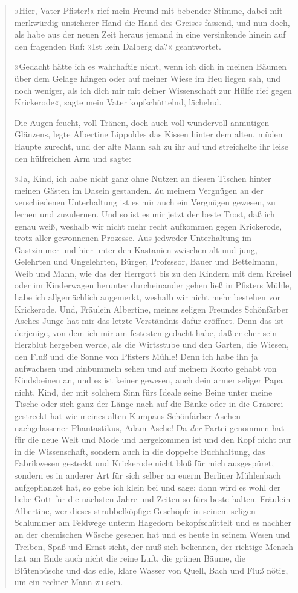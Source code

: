 \begin{verse}
»Hier, Vater Pfister!« rief mein Freund mit bebender Stimme, dabei
mit merkwürdig unsicherer Hand die Hand des Greises fassend, und
nun doch, als habe aus der neuen Zeit heraus jemand in eine
versinkende hinein auf den fragenden Ruf: »Ist kein Dalberg da?«
geantwortet.

»Gedacht hätte ich es wahrhaftig nicht, wenn ich dich in meinen
Bäumen über dem Gelage hängen oder auf meiner Wiese im Heu liegen
sah, und noch weniger, als ich dich mir mit deiner Wissenschaft zur
Hülfe rief gegen Krickerode«, sagte mein Vater kopfschüttelnd,
lächelnd.

Die Augen feucht, voll Tränen, doch auch voll wundervoll anmutigen
Glänzens, legte Albertine Lippoldes das Kissen hinter dem alten,
müden Haupte zurecht, und der alte Mann sah zu ihr auf und
streichelte ihr leise den hülfreichen Arm und sagte:

»Ja, Kind, ich habe nicht ganz ohne Nutzen an diesen Tischen hinter
meinen Gästen im Dasein gestanden. Zu meinem Vergnügen an der
verschiedenen Unterhaltung ist es mir auch ein Vergnügen gewesen,
zu lernen und zuzulernen. Und so ist es mir jetzt der beste Trost,
daß ich genau weiß, weshalb wir nicht mehr recht aufkommen gegen
Krickerode, trotz aller gewonnenen Prozesse. Aus jedweder
Unterhaltung im Gastzimmer und hier unter den Kastanien zwischen
alt und jung, Gelehrten und Ungelehrten, Bürger, Professor, Bauer
und Bettelmann, Weib und Mann, wie das der Herrgott bis zu den
Kindern mit dem Kreisel oder im Kinderwagen herunter durcheinander
gehen ließ in Pfisters Mühle, habe ich allgemächlich angemerkt,
weshalb wir nicht mehr bestehen vor Krickerode. Und, Fräulein
Albertine, meines seligen Freundes Schönfärber Asches Junge hat mir
das letzte Verständnis dafür eröffnet. Denn das ist derjenige, von
dem ich mir am festesten gedacht habe, daß er eher sein Herzblut
hergeben werde, als die Wirtsstube und den Garten, die Wiesen, den
Fluß und die Sonne von Pfisters Mühle! Denn ich habe ihn ja
aufwachsen und hinbummeln sehen und auf meinem Konto gehabt von
Kindsbeinen an, und es ist keiner gewesen, auch dein armer seliger
Papa nicht, Kind, der mit solchem Sinn fürs Ideale seine Beine
unter meine Tische oder sich ganz der Länge nach auf die Bänke oder
in die Gräserei gestreckt hat wie meines alten Kumpans Schönfärber
Aschen nachgelassener Phantastikus, Adam Asche! Da \emph{der}
Partei genommen hat für die neue Welt und Mode und hergekommen ist
und den Kopf nicht nur in die Wissenschaft, sondern auch in die
doppelte Buchhaltung, das Fabrikwesen gesteckt und Krickerode nicht
bloß für mich ausgespüret, sondern es in anderer Art für sich
selber an euerm Berliner Mühlenbach aufgepflanzet hat, so gebe ich
klein bei und sage: dann wird es wohl der liebe Gott für die
nächsten Jahre und Zeiten so fürs beste halten. Fräulein Albertine,
wer dieses strubbelköpfige Geschöpfe in seinem seligen Schlummer am
Feldwege unterm Hagedorn bekopfschüttelt und es nachher an der
chemischen Wäsche gesehen hat und es heute in seinem Wesen und
Treiben, Spaß und Ernst sieht, der muß sich bekennen, der richtige
Mensch hat am Ende auch nicht die reine Luft, die grünen Bäume, die
Blütenbüsche und das edle, klare Wasser von Quell, Bach und Fluß
nötig, um ein rechter Mann zu sein.


\end{verse}
